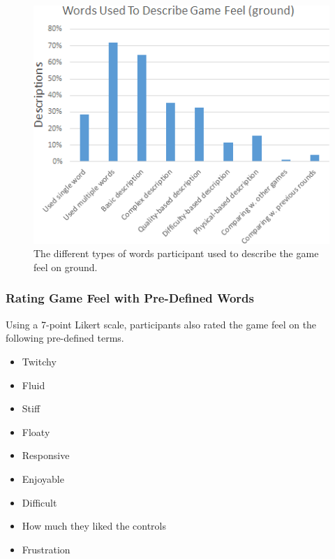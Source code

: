 \begin{figure}[htbp]
\centering
\includegraphics[width=\columnwidth]{Pics/coding1}
\caption{The different types of words participant used to describe the game feel on ground.}
\label{fig:coding1}
\end{figure}


\subsubsection{Rating Game Feel with Pre-Defined Words}
Using a 7-point Likert scale, participants also rated the game feel on the following pre-defined terms.
\begin{itemize}[noitemsep,nolistsep]
\item Twitchy
\item Fluid
\item Stiff
\item Floaty
\item Responsive
\item Enjoyable
\item Difficult
\item How much they liked the controls
\item Frustration
\end{itemize}

